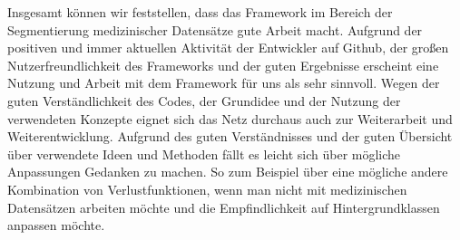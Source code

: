 Insgesamt können wir feststellen, dass das Framework im Bereich der Segmentierung medizinischer Datensätze gute Arbeit macht. Aufgrund der positiven und immer aktuellen Aktivität der Entwickler auf Github, der großen Nutzerfreundlichkeit des Frameworks und der guten Ergebnisse erscheint eine Nutzung und Arbeit mit dem Framework für uns als sehr sinnvoll. 
Wegen der guten Verständlichkeit des Codes, der Grundidee und der Nutzung der verwendeten Konzepte eignet sich das Netz durchaus auch zur Weiterarbeit und Weiterentwicklung. Aufgrund des guten Verständnisses und der guten Übersicht über verwendete Ideen und Methoden fällt es leicht sich über mögliche Anpassungen Gedanken zu machen. So zum Beispiel über eine mögliche andere Kombination von Verlustfunktionen, wenn man nicht mit medizinischen Datensätzen arbeiten möchte und die Empfindlichkeit auf Hintergrundklassen anpassen möchte. 






